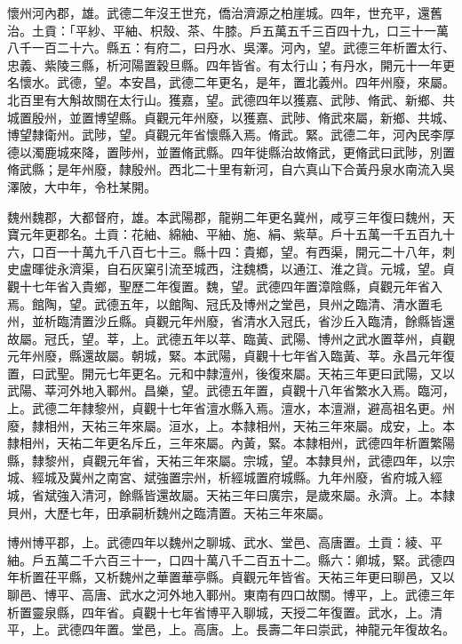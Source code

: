 \begin{pinyinscope}
 懷州河內郡，雄。武德二年沒王世充，僑治濟源之柏崖城。四年，世充平，還舊治。土貢：「平紗、平紬、枳殼、茶、牛膝。戶五萬五千三百四十九，口三十一萬八千一百二十六。縣五：有府二，曰丹水、吳澤。河內，望。武德三年析置太行、忠義、紫陵三縣，析河陽置穀旦縣。四年皆省。有太行山；有丹水，開元十一年更名懷水。武德，望。本安昌，武德二年更名，是年，置北義州。四年州廢，來屬。北百里有大斛故關在太行山。獲嘉，望。武德四年以獲嘉、武陟、脩武、新鄉、共城置殷州，並置博望縣。貞觀元年州廢，以獲嘉、武陟、脩武來屬，新鄉、共城、博望隸衛州。武陟，望。貞觀元年省懷縣入焉。脩武。緊。武德二年，河內民李厚德以濁鹿城來降，置陟州，並置脩武縣。四年徙縣治故脩武，更脩武曰武陟，別置脩武縣；是年州廢，隸殷州。西北二十里有新河，自六真山下合黃丹泉水南流入吳澤陂，大中年，令杜某開。



 魏州魏郡，大都督府，雄。本武陽郡，龍朔二年更名冀州，咸亨三年復曰魏州，天寶元年更郡名。土貢：花紬、綿紬、平紬、施、絹、紫草。戶十五萬一千五百九十六，口百一十萬九千八百七十三。縣十四：貴鄉，望。有西渠，開元二十八年，刺史盧暉徙永濟渠，自石灰窠引流至城西，注魏橋，以通江、淮之貨。元城，望。貞觀十七年省入貴鄉，聖歷二年復置。魏，望。武德四年置漳陰縣，貞觀元年省入焉。館陶，望。武德五年，以館陶、冠氏及博州之堂邑，貝州之臨清、清水置毛州，並析臨清置沙丘縣。貞觀元年州廢，省清水入冠氏，省沙丘入臨清，餘縣皆還故屬。冠氏，望。莘，上。武德五年以莘、臨黃、武陽、博州之武水置莘州，貞觀元年州廢，縣還故屬。朝城，緊。本武陽，貞觀十七年省入臨黃、莘。永昌元年復置，曰武聖。開元七年更名。元和中隸澶州，後復來屬。天祐三年更曰武陽，又以武陽、莘河外地入鄆州。昌樂，望。武德五年置，貞觀十八年省繁水入焉。臨河，上。武德二年隸黎州，貞觀十七年省澶水縣入焉。澶水，本澶淵，避高祖名更。州廢，隸相州，天祐三年來屬。洹水，上。本隸相州，天祐三年來屬。成安，上。本隸相州，天祐二年更名斥丘，三年來屬。內黃，緊。本隸相州，武德四年析置繁陽縣，隸黎州，貞觀元年省，天祐三年來屬。宗城，望。本隸貝州，武德四年，以宗城、經城及冀州之南宮、斌強置宗州，析經城置府城縣。九年州廢，省府城入經城，省斌強入清河，餘縣皆還故屬。天祐三年曰廣宗，是歲來屬。永濟。上。本隸貝州，大歷七年，田承嗣析魏州之臨清置。天祐三年來屬。



 博州博平郡，上。武德四年以魏州之聊城、武水、堂邑、高唐置。土貢：綾、平紬。戶五萬二千六百三十一，口四十萬八千二百五十二。縣六：卿城，緊。武德四年析置茌平縣，又析魏州之華置華亭縣。貞觀元年皆省。天祐三年更曰聊邑，又以聊邑、博平、高唐、武水之河外地入鄆州。東南有四口故關。博平，上。武德三年析置靈泉縣，四年省。貞觀十七年省博平入聊城，天授二年復置。武水，上。清平，上。武德四年置。堂邑，上。高唐。上。長壽二年曰崇武，神龍元年復故名。




\end{pinyinscope}
